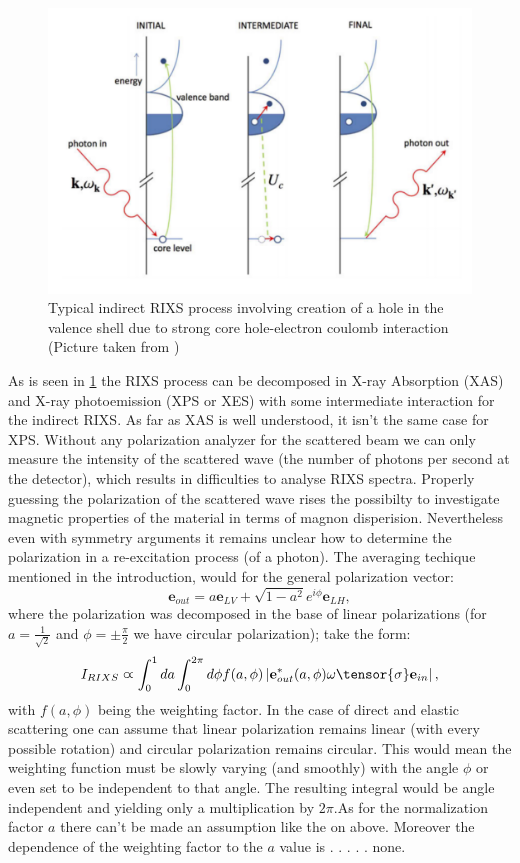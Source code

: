 \documentclass[twocolumn,amsmath,superscriptaddress,amssymb]{revtex4-1}
\let\vec\mathbf
\begin{document}
%
\begin{figure}[tp!]
        \includegraphics[width=0.8\columnwidth, height = 5 cm]{RIXSprocess.pdf}
\caption{Typical indirect RIXS process involving creation of a hole in the valence shell due to strong core hole-electron coulomb interaction \cite{GuarisePhD} (Picture taken from \cite{GuarisePhD})}
\label{Process} 
\end{figure}
\indent As is seen in \ref{Process} the RIXS process can be decomposed in X-ray Absorption (XAS) and X-ray photoemission (XPS or XES) with some intermediate interaction for the indirect RIXS. As far as XAS is well understood, it isn't the same case for XPS. Without any polarization analyzer for the scattered beam we can only measure the intensity of the scattered wave (the number of photons per second at the detector), which results in difficulties to analyse RIXS spectra. Properly guessing the polarization of the scattered wave rises the possibilty to investigate magnetic properties of the material in terms of magnon disperision. Nevertheless even with symmetry arguments it remains unclear how to determine the polarization in a re-excitation process (of a photon). 
%
The averaging techique mentioned in the introduction, would for the general polarization vector:
\begin{equation}
\vec{e}_{out}=a\vec{e}_{LV}+\sqrt{1-a^2}e^{i\phi}\vec{e}_{LH},
\end{equation}
\noindent where the polarization was decomposed in the base of linear polarizations (for $a=\frac{1}{\sqrt{2}}$ and $\phi=\pm\frac{\pi}{2}$ we have circular polarization); take the form:
%
\begin{equation}
I_{RIXS}\varpropto\int_0^1 da\int_0^{2\pi} d\phi f(a,\phi)\left|\vec{e}_{out}^*(a,\phi)\omega\tensor{\sigma}\vec{e}_{in}\right|, 
\end{equation}
\noindent with $f(a,\phi)$ being the weighting factor. In the case of direct and elastic scattering one can assume that linear polarization remains linear (with every possible rotation) and circular polarization remains circular. This would mean the weighting function must be slowly varying (and smoothly) with the angle $\phi$ or even set to be independent to that angle. The resulting integral would be angle independent and yielding only a multiplication by $2\pi$.As for the normalization factor $a$ there can't be made an assumption like the on above. Moreover the dependence of the weighting factor to the $a$ value is . . . . . none.
%
\end{document}
